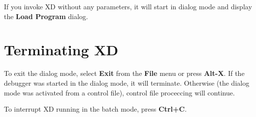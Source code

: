 If you invoke XD without any parameters, it will start in dialog
mode and display the {\bf Load Program} dialog.

\section{Terminating XD}

To exit the dialog mode, select {\bf Exit} from the {\bf File}
menu or press {\bf Alt-X}. If the debugger was started in the
dialog mode, it will terminate. Otherwise (the dialog mode
was activated from a control file), control file proceccing will
continue.

To interrupt XD running in the batch mode, press {\bf Ctrl+C}. %

